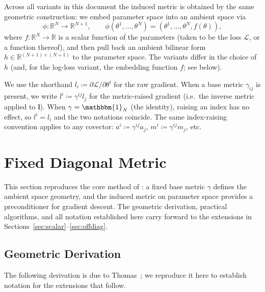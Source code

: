 \documentclass{article}
\newcommand{\loss}{\mathcal{L}}
\newcommand{\Id}{\mathbbm{1}}
\newcommand{\vecb}[1]{\boldsymbol{#1}}
\begin{document}
Across all variants in this document the induced metric is obtained by the same geometric construction:
we embed parameter space into an ambient space via $$
    \phi:\mathbb{R}^N\to\mathbb{R}^{N+1}, \qquad
    \phi(\theta^1,\ldots,\theta^N) = (\theta^1,\ldots,\theta^N,f(\theta)),
$$ where $f:\mathbb{R}^N\to\mathbb{R}$ is a scalar function of the parameters (taken to be the loss $\loss$, or a function thereof), and then pull back an ambient bilinear form $h\in\mathbb{R}^{(N+1)\times(N+1)}$ to the parameter space.
The variants differ in the choice of $h$ (and, for the log-loss variant, the embedding function $f$; see below).

We use the shorthand $l_i\coloneqq \partial \loss/\partial\theta^i$ for the raw gradient.
When a base metric $\gamma_{ij}$ is present, we write $l^i \coloneqq \gamma^{ij} l_j$ for the
metric-raised gradient (i.e.\ the inverse metric applied to $\vecb{l}$).
When $\gamma = \Id_N$ (the identity), raising an index has no effect, so $l^i = l_i$ and the two notations coincide.
The same index-raising convention applies to any covector:
$a^i \coloneqq \gamma^{ij}a_j$, $m^i \coloneqq \gamma^{ij}m_j$, etc.


\section{Fixed Diagonal Metric}\label{sec:fixed}
This section reproduces the core method of \cite{harvey2025}:
a fixed base metric $\gamma$ defines the ambient space geometry,
and the induced metric on parameter space provides a preconditioner
for gradient descent.
The geometric derivation, practical algorithms,
and all notation established here
carry forward to the extensions in
Sections~\ref{sec:scalar}--\ref{sec:offdiag}.

\subsection{Geometric Derivation}

The following derivation is due to Thomas~\cite{harvey2025};
we reproduce it here to establish notation for the extensions that follow.
\end{document}

